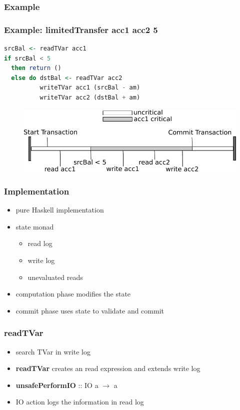 \documentclass{beamer}
\newcommand{\code}[1]{\textbf{#1}}
\begin{document}
  \begin{frame}
    \frametitle{Example}
       
  \end{frame}
  
  \begin{frame}[fragile]
   \frametitle{Example: limitedTransfer acc1 acc2 5}
   \begin{lstlisting}[language=Haskell]
srcBal <- readTVar acc1
if srcBal < 5
  then return ()
  else do dstBal <- readTVar acc2
          writeTVar acc1 (srcBal - am)
          writeTVar acc2 (dstBal + am)
   \end{lstlisting}
   \pause
   \begin{figure}
    \includegraphics[scale=0.7]{ressources/lessCriticalValue.pdf}
   \end{figure}
\end{frame}
  

  \begin{frame}
  \frametitle{Implementation}
  \begin{itemize}\setlength\itemsep{1em}
   \item pure Haskell implementation
   \item state monad
   \begin{itemize}
    \item read log
    \item write log
    \item unevaluated reads
   \end{itemize}
   \item computation phase modifies the state 
   \item commit phase uses state to validate and commit
  \end{itemize}
  \end{frame}

  
  \begin{frame}
  \frametitle{readTVar}
  \begin{itemize}\setlength\itemsep{1em}
   \item search TVar in write log
   \vfill
   \item \code{readTVar} creates an read expression and extends write log
   \item \code{unsafePerformIO} :: IO a $\rightarrow$ a 
   \item IO action logs the information in read log
  \end{itemize}
  \end{frame}
\end{document}
